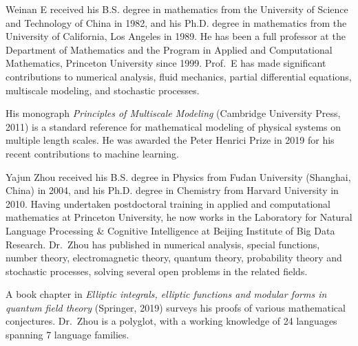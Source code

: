 \documentclass[10pt,journal,compsoc]{IEEEtran}
\begin{document}
%
\begin{IEEEbiographynophoto}{Weinan E}
 received his B.S. degree in mathematics from the University of Science and Technology of China in 1982, and his Ph.D. degree in mathematics from the University of California, Los Angeles in 1989. He has been a full professor at the Department of Mathematics and the Program in Applied and Computational Mathematics, Princeton University since 1999. Prof.\ E has made significant contributions to numerical analysis,  fluid mechanics, partial differential equations,  multiscale modeling, and stochastic processes.

His monograph \textit{Principles of Multiscale Modeling} (Cambridge University Press, 2011) is a standard reference for mathematical modeling of  physical systems on multiple length scales. He was awarded the Peter Henrici Prize in 2019 for his recent contributions to machine learning.
\end{IEEEbiographynophoto}


\begin{IEEEbiographynophoto}{Yajun Zhou}
received his B.S. degree in Physics from Fudan University
(Shanghai, China) in 2004, and his Ph.D. degree in Chemistry from Harvard University in 2010. Having undertaken postdoctoral training in applied and computational mathematics at Princeton University, he now works in the Laboratory for Natural Language Processing \& Cognitive Intelligence at Beijing Institute of Big Data Research. Dr.\ Zhou has published in numerical analysis, special functions, number theory, electromagnetic theory, quantum theory, probability theory and stochastic processes, solving several open problems in the related fields.

A book chapter in \textit{Elliptic integrals, elliptic functions and modular forms in quantum field theory} (Springer, 2019) surveys  his   proofs of various mathematical conjectures. Dr.\ Zhou is a polyglot, with a working knowledge of 24 languages spanning 7 language families. \end{IEEEbiographynophoto}
\end{document}
